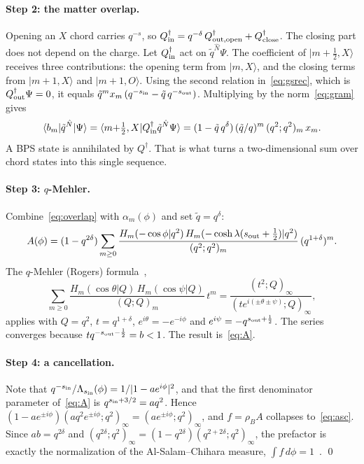 \documentclass[11pt]{article}
\newcommand{\sI}{s_{\rm in}}
\newcommand{\sout}{s_{\rm out}}
\newcommand{\qt}{\tilde q}
\newcommand{\Nh}{\hat N}
\newcommand{\poch}[2]{(#1;#2)_\infty}
\theoremstyle{plain}
\theoremstyle{remark}
\numberwithin{equation}{section}
\begin{document}
\paragraph{Step 2: the matter overlap.} Opening an $X$ chord carries $q^{-s}$, so
$Q^\dagger_{\rm in}=q^{-\delta}\,Q^\dagger_{\rm out,open}+Q^\dagger_{\rm close}$. The closing part does not depend on the
charge. Let $Q^\dagger_{\rm in}$ act on $\qt^{\Nh}\Psi$. The coefficient of $|m{+}\frac12,X\rangle$ receives three
contributions: the opening term from $|m,X\rangle$, and the closing terms from $|m{+}1,X\rangle$ and $|m{+}1,O\rangle$.
Using the second relation in~\eqref{eq:gsrec}, which is $Q^\dagger_{\rm out}\Psi=0$, it equals
$\qt^m x_m\,(q^{-\sI}-\qt\,q^{-\sout})$. Multiplying by the norm~\eqref{eq:gram} gives
\begin{equation}\label{eq:overlap}
\langle b_m|\qt^{\Nh}|\Psi\rangle=\langle m{+}\tfrac12,X|Q^\dagger_{\rm in}\qt^{\Nh}\Psi\rangle
=(1-\qt\,q^{\delta})\,(\qt/q)^m\,(q^2;q^2)_m\,x_m .
\end{equation}
A BPS state is annihilated by $Q^\dagger$. That is what turns a two-dimensional sum over chord states into this single
sequence.

\paragraph{Step 3: $q$-Mehler.} Combine~\eqref{eq:overlap} with $\alpha_m(\phi)$ and set $\qt=q^\delta$:
\[
A(\phi)=(1-q^{2\delta})\sum_{m\ge0}\frac{H_m(-\cos\phi|q^2)\,H_m(-\cosh\lambda(\sout+\tfrac12)|q^2)}{(q^2;q^2)_m}\,(q^{1+\delta})^m .
\]
The $q$-Mehler (Rogers) formula~\cite{GR,KLS},
\[
\sum_{m\ge0}\frac{H_m(\cos\theta|Q)\,H_m(\cos\psi|Q)}{(Q;Q)_m}\,t^m=\frac{\poch{t^2}{Q}}{\poch{te^{i(\pm\theta\pm\psi)}}{Q}},
\]
applies with $Q=q^2$, $t=q^{1+\delta}$, $e^{i\theta}=-e^{-i\phi}$ and $e^{i\psi}=-q^{\sout+\frac12}$. The series converges
because $tq^{-\sout-\frac12}=b<1$. The result is~\eqref{eq:A}.

\paragraph{Step 4: a cancellation.} Note that $q^{-\sI}/\Lambda_{\sI}(\phi)=1/|1-ae^{i\phi}|^2$, and that the first
denominator parameter of~\eqref{eq:A} is $q^{\sI+3/2}=aq^2$. Hence
$(1-ae^{\pm i\phi})\poch{aq^2e^{\pm i\phi}}{q^2}=\poch{ae^{\pm i\phi}}{q^2}$, and $f=\rho_BA$ collapses
to~\eqref{eq:asc}. Since $ab=q^{2\delta}$ and $\poch{q^{2\delta}}{q^2}=(1-q^{2\delta})\poch{q^{2+2\delta}}{q^2}$, the
prefactor is exactly the normalization of the Al-Salam--Chihara measure, $\int f\,d\phi=1$~\cite{KLS}. \qed
\end{document}
